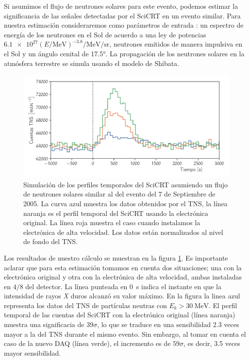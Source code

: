 Si asumimos el flujo de neutrones solares para este evento, podemos estimar la significancia de las señales detectadas por el SciCRT en un evento similar. Para nuestra estimación consideraremos como parámetros de entrada \cite{ynagai14}: un espectro de energía de los neutrones en el Sol de acuerdo a una ley de potencias
$\num{6.1e27}\left(E/\si{\mega\electronvolt}\right)^{-3.8}\si{\per\mega\electronvolt\per\steradian}$, neutrones emitidos de manera impulsiva en el Sol y un ángulo cenital de \ang{17.5}. La propagación de los neutrones solares en la atmósfera terrestre se simula usando el modelo de Shibata.

\begin{figure}
\centering
  \includegraphics[width=\textwidth]{scicrt-sim.pdf}
  \caption{Simulación de los perfiles temporales del SciCRT asumiendo un flujo de neutrones solares similar al del evento del \num{7} de Septiembre de \num{2005}. La curva azul muestra los datos obtenidos por el TNS, la línea naranja es el perfil temporal del SciCRT usando la electrónica original. La línea roja muestra el caso cuando instalamos la electrónica de alta velocidad. Los datos están normalizados al nivel de fondo del TNS.}
  \label{fig:solar-sim}
\end{figure}

Los resultados de nuestro cálculo se muestran en la figura \ref{fig:solar-sim}. Es importante aclarar que para esta estimación tomamos en cuenta dos situaciones; una con la electrónica original y otra con la electrónica de alta velocidad, ambas instaladas en $4/8$ del detector. La línea punteada en \SI{0}{\second} indica el instante en que la intensidad de rayos \emph{X} duros alcanzó su valor máximo. En la figura la linea azul representa los datos del TNS de partículas neutras con $E_{k}>\SI{30}{\mega\electronvolt}$. El perfil temporal de las cuentas del SciCRT con la electrónica original (línea naranja) muestra una significacia de $39\sigma$, lo que se traduce en una sensibilidad \num{2.3} veces mayor a la del TNS durante el mismo evento. Sin embargo, al tomar en cuenta el caso de la nuevo DAQ (línea verde), el incremento es de $59\sigma$, es decir, \num{3.5} veces mayor sensibilidad.

